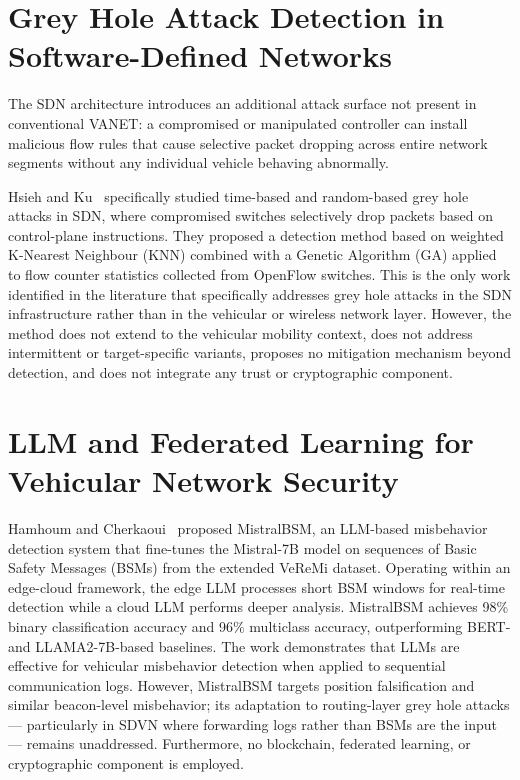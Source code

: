 \documentclass[12pt, a4paper]{report}
\begin{document}
\section{Grey Hole Attack Detection in Software-Defined Networks}
\label{sec:lit_sdn_greyhole}

The SDN architecture introduces an additional attack surface not present in
conventional VANET: a compromised or manipulated controller can install
malicious flow rules that cause selective packet dropping across entire network
segments without any individual vehicle behaving abnormally.

Hsieh and Ku~\cite{hsieh2018sdn} specifically studied time-based and
random-based grey hole attacks in SDN, where compromised switches selectively
drop packets based on control-plane instructions. They proposed a detection
method based on weighted K-Nearest Neighbour (KNN) combined with a Genetic
Algorithm (GA) applied to flow counter statistics collected from OpenFlow
switches. This is the only work identified in the literature that specifically
addresses grey hole attacks in the SDN infrastructure rather than in the
vehicular or wireless network layer. However, the method does not extend to the
vehicular mobility context, does not address intermittent or target-specific
variants, proposes no mitigation mechanism beyond detection, and does not
integrate any trust or cryptographic component.

\section{LLM and Federated Learning for Vehicular Network Security}
\label{sec:lit_llm_fl}

Hamhoum and Cherkaoui~\cite{hamhoum2024mistralbsm} proposed MistralBSM, an
LLM-based misbehavior detection system that fine-tunes the Mistral-7B model on
sequences of Basic Safety Messages (BSMs) from the extended VeReMi dataset.
Operating within an edge-cloud framework, the edge LLM processes short BSM
windows for real-time detection while a cloud LLM performs deeper analysis.
MistralBSM achieves 98\% binary classification accuracy and 96\% multiclass
accuracy, outperforming BERT- and LLAMA2-7B-based baselines. The work
demonstrates that LLMs are effective for vehicular misbehavior detection when
applied to sequential communication logs. However, MistralBSM targets position
falsification and similar beacon-level misbehavior; its adaptation to
routing-layer grey hole attacks — particularly in SDVN where forwarding logs
rather than BSMs are the input — remains unaddressed. Furthermore, no
blockchain, federated learning, or cryptographic component is employed.
\end{document}
